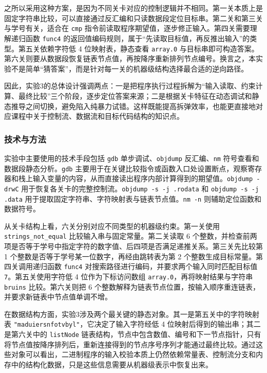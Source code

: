 \documentclass[supercite]{Experimental_Report}
\theoremstyle{definition}
\begin{document}
之所以采用这种方案，是因为不同关卡对应的控制逻辑并不相同。第一关本质上是固定字符串比较，可以直接通过反汇编和只读数据段定位目标串。第二关和第三关与学号有关，适合在 \texttt{cmp} 指令前读取程序期望值，逐步修正输入。第四关需要理解递归函数 \texttt{func4} 的返回值编码规则，属于“先读取目标值，再反推出输入”的类型。第五关依赖字符低 4 位映射表，静态查看 \texttt{array.0} 与目标串即可构造答案。第六关则要从数据段恢复链表节点值，再按降序重新排列节点编号。换言之，本实验不是简单“猜答案”，而是针对每一关的机器级结构选择最合适的逆向路径。

因此，实验3的总体设计强调两点：一是把程序执行过程拆解为“输入读取、约束计算、最终比较”三个阶段，逐步定位答案来源；二是根据关卡特征在动态调试和静态推导之间切换，避免陷入纯暴力试错。这样既能提高拆弹效率，也能更直接地对应课程中关于控制流、数据流和目标代码结构的知识点。

\subsubsection{技术与方法}
实验中主要使用的技术手段包括 \texttt{gdb} 单步调试、\texttt{objdump} 反汇编、\texttt{nm} 符号查看和数据段静态分析。\texttt{gdb} 主要用于在关键比较指令或函数入口处设置断点，观察寄存器和栈上输入变量的内容，从而直接读出程序内部计算得到的期望值。\texttt{objdump -drwC} 用于恢复各关卡的完整控制流。\texttt{objdump -s -j .rodata} 和 \texttt{objdump -s -j .data} 用于提取固定字符串、字符映射表与链表节点值。\texttt{nm -n} 则辅助定位函数和数据符号。

从关卡结构上看，六关分别对应不同类型的机器级约束。第一关使用 \texttt{strings\_not\_equal} 比较输入串与固定常量。第二关读取 6 个整数，并检查前两项是否等于学号中指定字符的数字值、后四项是否满足递推关系。第三关先比较第 1 个整数是否等于学号某一位数字，再经由跳转表为第 2 个整数生成目标常量。第四关调用递归函数 \texttt{func4} 对搜索路径进行编码，并要求两个输入同时匹配目标值 \texttt{7}。第五关使用字符低 4 位作为下标访问数组 \texttt{array.0}，再将映射结果与字符串 \texttt{bruins} 比较。第六关则把 6 个整数解释为链表节点位置，按输入顺序重连链表，并要求新链表中节点值单调不增。

在数据结构方面，实验3涉及两个最关键的静态对象。其一是第五关中的字符映射表 \texttt{"maduiersnfotvbyl"}，它决定了输入字符经低 4 位映射后得到的输出串；其二是第六关中的 \texttt{listNode} 链表结构，节点中包含数值、编号和下一节点指针，只有将节点值按降序排列后，重新连接得到的节点序号序列才能通过最终比较。通过这些对象可以看出，二进制程序的输入校验本质上仍然依赖常量表、控制流分支和内存中的结构化数据，只是这些信息需要从机器级表示中恢复出来。
\end{document}
